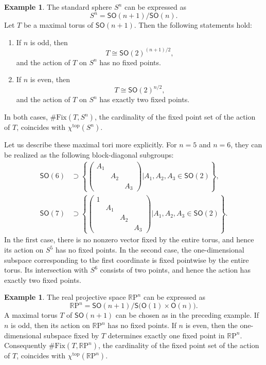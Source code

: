 \documentclass[12pt]{amsart}
\theoremstyle{definition}
\newtheorem{Ex}[Prop]{Example}
\newcommand{\R}{{\mathbb R}}
\newcommand{\RP}{\R \mathrm{P}}
\newcommand{\Fix}{\mathrm{Fix}}
\begin{document}
\begin{Ex}
The standard sphere $S^n$ can be expressed as 
\[
S^n = \mathsf{SO}(n+1)/\mathsf{SO}(n) . 
\]
Let $T$ be a maximal torus of $\mathsf{SO}(n+1)$. 
Then the following statements hold: 
\begin{enumerate}
\item
If $n$ is odd, then
\[
T\cong \mathsf{SO}(2)^{(n+1)/2},
\]
and the action of $T$ on $S^n$ has no fixed points.

\item
If $n$ is even, then
\[
T\cong \mathsf{SO}(2)^{n/2},
\]
and the action of $T$ on $S^n$ has exactly two fixed points.
\end{enumerate}
In both cases, $\#\Fix(T,S^n)$, 
the cardinality of the fixed point set of the action of $T$, 
coincides with $\chi^{\mathrm{top}}(S^n)$. 
\end{Ex}

Let us describe these maximal tori more explicitly.
For $n=5$ and $n=6$, they can be realized as the following block-diagonal subgroups:
\begin{align*}
\mathsf{SO}(6)
&\supset
\left\{
\begin{pmatrix}
A_1 & & \\
& A_2 & \\
& & A_3
\end{pmatrix}
\mathrel{\Big|}
A_1,A_2,A_3\in\mathsf{SO}(2)
\right\},
\\
\mathsf{SO}(7)
&\supset
\left\{
\begin{pmatrix}
1 & & & \\
& A_1 & & \\
& & A_2 & \\
& & & A_3
\end{pmatrix}
\mathrel{\Big|}
A_1,A_2,A_3\in\mathsf{SO}(2)
\right\}.
\end{align*}
In the first case,
there is no nonzero vector fixed by the entire torus,
and hence its action on $S^5$ has no fixed points.
In the second case,
the one-dimensional subspace corresponding to the first coordinate
is fixed pointwise by the entire torus.
Its intersection with $S^6$ consists of two points,
and hence the action has exactly two fixed points.

\begin{Ex}
The real projective space $\RP^n$ can be expressed as
\[
\RP^n
=
\mathsf{SO}(n+1)/
\mathsf{S}\bigl(\mathsf{O}(1)\times\mathsf{O}(n)\bigr).
\]
A maximal torus $T$ of $\mathsf{SO}(n+1)$
can be chosen as in the preceding example.
If $n$ is odd,
then its action on $\RP^n$ has no fixed points.
If $n$ is even,
then the one-dimensional subspace fixed by $T$
determines exactly one fixed point in $\RP^n$.
Consequently $\#\Fix(T,\RP^n)$, 
the cardinality of the fixed point set of the action of $T$, 
coincides with $\chi^{\mathrm{top}}(\RP^n)$. 
\end{Ex}
\end{document}
